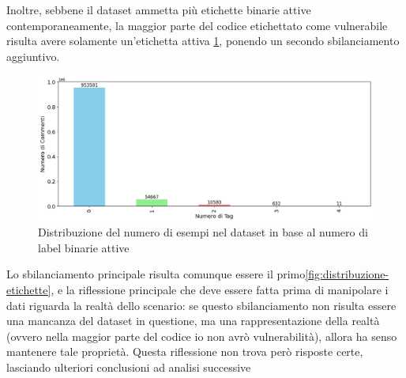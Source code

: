 \documentclass[conference]{IEEEtran}
\begin{document}
Inoltre, sebbene il dataset ammetta più etichette binarie attive contemporaneamente, la maggior parte del codice etichettato come vulnerabile risulta avere solamente un'etichetta attiva \ref{fig:distribuzione-tag}, ponendo un secondo sbilanciamento aggiuntivo.
\begin{figure}
    \centering
    \includegraphics[width=\columnwidth]{images/VDISC/OSF-num-tag.png}
    \caption{Distribuzione del numero di esempi nel dataset in base al numero di label binarie attive}
    \label{fig:distribuzione-tag}
\end{figure}
%
Lo sbilanciamento principale risulta comunque essere il primo\ref{fig:distribuzione-etichette}, e la riflessione principale che deve essere fatta prima di manipolare i dati riguarda la realtà dello scenario: se questo sbilanciamento non risulta essere una mancanza del dataset in questione, ma una rappresentazione della realtà (ovvero nella maggior parte del codice io non avrò vulnerabilità), allora ha senso mantenere tale proprietà. Questa riflessione non trova però risposte certe, lasciando ulteriori conclusioni ad analisi successive

    
\end{document}

